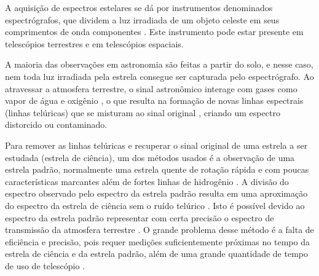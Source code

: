 \documentclass[11pt,twoside,a4paper]{article}
\begin{document}
\par A aquisição de espectros estelares se dá por instrumentos denominados espectrógrafos, que dividem a luz irradiada de um objeto celeste em seus comprimentos de onda componentes \cite{spectrograph_aus}. Este instrumento pode estar presente em telescópios terrestres e em telescópios espaciais.

\par A maioria das observações em astronomia são feitas a partir do solo, e nesse caso, nem toda luz irradiada pela estrela consegue ser capturada pelo espectrógrafo. Ao atravessar a atmosfera terrestre, o sinal astronômico interage com gases como vapor de água e oxigênio \cite{seifahrt2010precise}, o que resulta na formação de novas linhas espectrais (linhas telúricas) que se misturam ao sinal original \cite{catanzaro1997high}, criando um espectro distorcido ou contaminado.

\par Para remover as linhas telúricas e recuperar o sinal original de uma estrela a ser estudada (estrela de ciência), um dos métodos usados é a observação de uma estrela padrão, normalmente uma estrela quente de rotação rápida e com poucas características marcantes além de fortes linhas de hidrogênio \cite{seifahrt2010precise}. A divisão do espectro observado pelo espectro da estrela padrão resulta em uma aproximação do espectro da estrela de ciência sem o ruído telúrico \cite{rudolf2016modelling}. Isto é possível devido ao espectro da estrela padrão representar com certa precisão o espectro de transmissão da atmosfera terrestre \cite{ulmer2019telluric}. O grande problema desse método é a falta de eficiência e precisão, pois requer medições suficientemente próximas no tempo da estrela de ciência e da estrela padrão, além de uma grande quantidade de tempo de uso de telescópio \cite{seifahrt2010precise}. 
\end{document}
